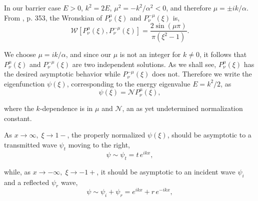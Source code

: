 \documentclass{article}
\numberwithin{equation}{section}
\begin{document}
\medskip

In our barrier case $E>0$, $k^2=2E$, $\mu^2=-k^2/\alpha^2<0$, and therefore $\mu=\pm ik/\alpha$.  From \cite{OLBC10}, p. 353, the Wronskian of $P^{\mu}_{\nu}(\xi)$ and $P^{-\mu}_{\nu}(\xi)$ is,
\begin{equation}
\mathcal{W}\left[P^{\mu}_{\nu}(\xi),P^{-\mu}_{\nu}(\xi)\right]=\frac{2\sin{(\mu \pi)}}{\pi\left(\xi^2-1\right)}.\label{W}
\end{equation}

We choose $\mu=ik/\alpha$, and since our $\mu$ is not an integer for $k\neq 0$, it follows that $P^{\mu}_{\nu}(\xi)$ and $P^{-\mu}_{\nu}(\xi)$ are two independent solutions.  As we shall see, $P^{\mu}_{\nu}(\xi)$ has the desired asymptotic behavior while $P^{-\mu}_{\nu}(\xi)$ does not.  Therefore we write the eigenfunction $\psi(\xi)$, corresponding to the energy eigenvalue $E=k^{2}/2$, as
\begin{equation}
\psi(\xi)=\mathcal{N}P^{\mu}_{\nu}(\xi),\label{psi}
\end{equation}

where the $k$-dependence is in $\mu$ and $\mathcal{N}$, an as yet undetermined normalization constant.
 
As $x\to \infty,\;\xi\to 1-$, the properly normalized $\psi(\xi)$, should be asymptotic to a transmitted wave $\psi_t$ moving to the right,
\begin{equation}
\psi\sim\psi_t=t\,e^{ikx},\label{a+}
\end{equation}

while, as $x\to -\infty,\;\xi\to -1+$, it should be asymptotic to an incident wave $\psi_i$ and a reflected $\psi_r$ wave,
\begin{equation}
\psi\sim\psi_i+\psi_r=e^{ikx}+r\,e^{-ikx},\label{a-}
\end{equation}
\end{document}

